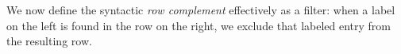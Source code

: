\documentclass[authoryear, acmsmall, screen, review, nonacm]{acmart} %
\begin{document}
\begin{code}[hide]%
\>[0]\AgdaSpace{}%
\AgdaSpace{}%
\AgdaInductiveConstructor{[]}\AgdaSpace{}%
\AgdaSymbol{=}\AgdaSpace{}%
\AgdaSpace{}%
\AgdaSpace{}%
\AgdaSymbol{\{}\AgdaSpace{}%
\AgdaSymbol{()}\AgdaSpace{}%
\AgdaSymbol{\})}\<%
\\
\>[0]\AgdaSpace{}%
\AgdaSpace{}%
\AgdaSymbol{((}\AgdaSpace{}%
\AgdaOperator{\AgdaInductiveConstructor{,}}\AgdaSpace{}%
\AgdaSymbol{\AgdaUnderscore{})}\AgdaSpace{}%
\AgdaSpace{}%
\AgdaSymbol{)}\AgdaSpace{}%
\AgdaSpace{}%
\AgdaSpace{}%
\AgdaSpace{}%
\<%
\\
\>[0]\AgdaSpace{}%
\AgdaSymbol{|}\AgdaSpace{}%
\AgdaSpace{}%
\AgdaSpace{}%
\AgdaSymbol{=}\AgdaSpace{}%
\AgdaSpace{}%
\<%
\\
\>[0]\AgdaSpace{}%
\AgdaSymbol{|}\AgdaSpace{}%
%
\>[10]\AgdaSpace{}%
\AgdaSpace{}%
\AgdaSpace{}%
\AgdaSpace{}%
\<%
\\
\>[0]%
\>[12]\AgdaSymbol{|}\AgdaSpace{}%
\AgdaSpace{}%
\AgdaSpace{}%
\AgdaSymbol{=}\AgdaSpace{}%
\AgdaSpace{}%
\AgdaSymbol{(}\AgdaSpace{}%
\AgdaSymbol{)}\<%
\\
\>[0]%
\>[12]\AgdaSymbol{|}\AgdaSpace{}%
%
\>[18]\AgdaSpace{}%
\AgdaSymbol{=}\AgdaSpace{}%
\AgdaSpace{}%
\AgdaSpace{}%
\AgdaSymbol{\{}\AgdaSpace{}%
\AgdaSpace{}%
\AgdaSpace{}%
\AgdaSpace{}%
\AgdaSpace{}%
\AgdaSymbol{;}\AgdaSpace{}%
\AgdaSymbol{(}\AgdaSpace{}%
\AgdaSymbol{)}\AgdaSpace{}%
\AgdaSpace{}%
\AgdaSpace{}%
\AgdaSpace{}%
\AgdaSymbol{\}}\<%
\end{code}

We now define the syntactic \emph{row complement} effectively as a filter: when a label on the left is found in the row on the right, we exclude that labeled entry from the resulting row.
\end{document}
